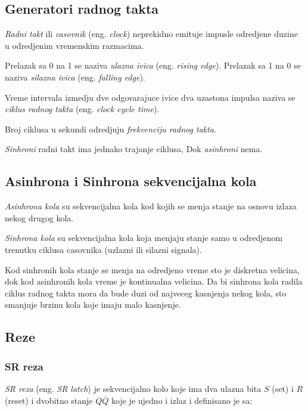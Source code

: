 \documentclass[12p,a4paper]{article}
\begin{document}
\begin{multicols}{2}
    \subsection{Generatori radnog takta}

    \emph{Radni takt} ili \emph{casovnik} (eng. \emph{clock}) neprekidno 
    emituje impusle odredjene duzine u odredjenim vremenskim razmacima. 

    Prelazak sa 0 na 1 se naziva \emph{ulazna ivica} 
    (eng. \emph{rising edge}).
    Prelazak sa 1 na 0 se naziva \emph{silazna ivica} 
    (eng. \emph{falling edge}).

    Vreme intervala izmedju dve odgovarajuce ivice dva uzastona impulsa 
    naziva se \emph{ciklus radnog takta} (eng. \emph{clock cycle time}).

    Broj ciklusa u sekundi odredjuju \emph{frekvenciju radnog takta}.

    \emph{Sinhroni} radni takt ima jednako trajanje ciklusa, Dok 
    \emph{asinhroni} nema.

    \subsection{Asinhrona i Sinhrona sekvencijalna kola}

    \emph{Asinhrona kola} su sekvencijalna kola kod kojih se menja stanje na
    osnovu izlaza nekog drugog kola.

    \emph{Sinhrona kola} su sekvencijalna kola koja menjaju stanje samo u 
    odredjenom trenutku ciklusa casovnika (uzlazni ili silazni signala).

    Kod sinhronih kola stanje se menja na odredjeno vreme sto je diskretna
    velicina, dok kod asinhronih kola vreme je kontinualna velicina.
    Da bi sinhrona kola radila ciklus radnog takta mora da bude duzi od 
    najveceg kasnjenja nekog kola, sto smanjuje brzinu kola koje imaju malo
    kasnjenje.

    \subsection{Reze}

    \subsubsection{SR reza}

    \emph{SR reza} (eng. \emph{SR latch}) je sekvencijalno kolo koje ima dva
    ulazna bita $S$ (set) i $R$ (reset) i dvobitno stanje $Q\overline{Q}$ 
    koje je ujedno i izlaz i definisano je sa:


\end{multicols}
\end{document}
